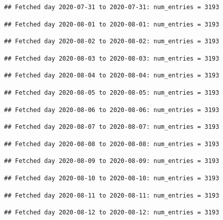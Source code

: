 \documentclass[]{article}
\begin{document}
\begin{verbatim}
## Fetched day 2020-07-31 to 2020-07-31: num_entries = 3193
\end{verbatim}

\begin{verbatim}
## Fetched day 2020-08-01 to 2020-08-01: num_entries = 3193
\end{verbatim}

\begin{verbatim}
## Fetched day 2020-08-02 to 2020-08-02: num_entries = 3193
\end{verbatim}

\begin{verbatim}
## Fetched day 2020-08-03 to 2020-08-03: num_entries = 3193
\end{verbatim}

\begin{verbatim}
## Fetched day 2020-08-04 to 2020-08-04: num_entries = 3193
\end{verbatim}

\begin{verbatim}
## Fetched day 2020-08-05 to 2020-08-05: num_entries = 3193
\end{verbatim}

\begin{verbatim}
## Fetched day 2020-08-06 to 2020-08-06: num_entries = 3193
\end{verbatim}

\begin{verbatim}
## Fetched day 2020-08-07 to 2020-08-07: num_entries = 3193
\end{verbatim}

\begin{verbatim}
## Fetched day 2020-08-08 to 2020-08-08: num_entries = 3193
\end{verbatim}

\begin{verbatim}
## Fetched day 2020-08-09 to 2020-08-09: num_entries = 3193
\end{verbatim}

\begin{verbatim}
## Fetched day 2020-08-10 to 2020-08-10: num_entries = 3193
\end{verbatim}

\begin{verbatim}
## Fetched day 2020-08-11 to 2020-08-11: num_entries = 3193
\end{verbatim}

\begin{verbatim}
## Fetched day 2020-08-12 to 2020-08-12: num_entries = 3193
\end{verbatim}
\end{document}
